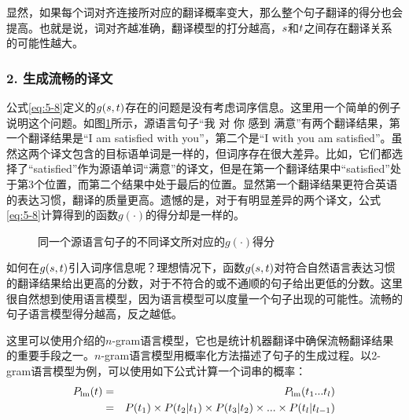 \parinterval  显然，如果每个词对齐连接所对应的翻译概率变大，那么整个句子翻译的得分也会提高。也就是说，词对齐越准确，翻译模型的打分越高，${s}$和${t}$之间存在翻译关系的可能性越大。


\subsubsection{2. 生成流畅的译文}

\parinterval 公式\eqref{eq:5-8}定义的$g({s},{t})$存在的问题是没有考虑词序信息。这里用一个简单的例子说明这个问题。如图\ref{fig:5-8}所示，源语言句子“我 对 你 感到 满意”有两个翻译结果，第一个翻译结果是“I am satisfied with you”，第二个是“I with you am satisfied”。虽然这两个译文包含的目标语单词是一样的，但词序存在很大差异。比如，它们都选择了“satisfied”作为源语单词“满意”的译文，但是在第一个翻译结果中“satisfied”处于第3个位置，而第二个结果中处于最后的位置。显然第一个翻译结果更符合英语的表达习惯，翻译的质量更高。遗憾的是，对于有明显差异的两个译文，公式\eqref{eq:5-8}计算得到的函数$g(\cdot)$的得分却是一样的。

\begin{figure}[htp]
    \centering

    \caption{同一个源语言句子的不同译文所对应的$g(\cdot)$得分}
    \label{fig:5-8}
\end{figure}

\parinterval 如何在$g({s},{t})$引入词序信息呢？理想情况下，函数$g({s},{t})$对符合自然语言表达习惯的翻译结果给出更高的分数，对于不符合的或不通顺的句子给出更低的分数。这里很自然想到使用语言模型，因为语言模型可以度量一个句子出现的可能性。流畅的句子语言模型得分越高，反之越低。

\parinterval 这里可以使用{\chaptertwo}介绍的$n$-gram语言模型，它也是统计机器翻译中确保流畅翻译结果的重要手段之一。$n$-gram语言模型用概率化方法描述了句子的生成过程。以2-gram语言模型为例，可以使用如下公式计算一个词串的概率：
\begin{eqnarray}
{P}_{\textrm{lm}}({t}) & = & {P}_{\textrm{lm}}(t_1...t_l) \nonumber \\
                                           & =  & {P}(t_1)\times {P}(t_2|t_1)\times {P}(t_3|t_2)\times ... \times {P}(t_l|t_{l-1})
\label{eq:5-10}
\end{eqnarray}

